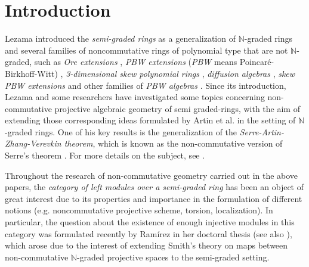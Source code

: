 \documentclass[reqno]{amsart}
\theoremstyle{definition}
\theoremstyle{remark}
\numberwithin{equation}{section}
\begin{document}
\maketitle


\section{Introduction}

Lezama \cite{LezamaLatorre2017} introduced the {\em semi-graded rings} as a generalization of $\mathbb{N}$-graded rings and several families of noncommutative rings of polynomial type that are not $\mathbb{N}$-graded, such as {\em Ore extensions} \cite{Fajardoetal2024, Ore1933}, {\em PBW extensions} ({\em PBW} means Poincar\'e-Birkhoff-Witt) \cite{BellGoodearl1988}, {\em 3-dimensional skew polynomial rings} \cite{BellSmith1990, Rosenberg1995}, {\em diffusion algebras} \cite{IsaevPyatovRittenberg2001, PyatovTwarock2002}, {\em skew PBW extensions} \cite{Fajardoetal2020, GallegoLezama2010, LezamaReyes2014} and other families of {\em PBW algebras} \cite{BuesoTorrecillasVerschoren2003, ReyesRodriguez2021, SeilerBook2010}. Since its introduction, Lezama and some researchers have investigated some topics concerning non-commutative projective algebraic geometry of semi graded-rings, with the aim of extending those corresponding ideas formulated by Artin et al. \cite{Artin1992, ArtinSchelter1987, ArtinTateVandenBergh2007, ArtinTateVandenBergh1991, ArtinZhang1994} in the setting of $\mathbb{N}$-graded rings. One of his key results is the generalization of the {\em Serre-Artin-Zhang-Verevkin theorem}, which is known as the non-commutative version of Serre's theorem \cite{Serre1995}. For more details on the subject, see \cite{ArtinZhang1994, ChaconPhDThesis2022, ChaconReyes2025, Lezama2021, Verevkin1992a, Verevkin1992}.

Throughout the research of non-commutative geometry carried out in the above papers, the {\em category of left modules over a semi-graded ring} has been an object of great interest due to its properties and importance in the formulation of different notions (e.g. noncommutative projective scheme, torsion, localization). In particular, the question about the existence of enough injective modules in this category was formulated recently by Ram\'irez in her doctoral thesis \cite[Section 3.4]{RamirezPhDThesis2023} (see also \cite[Section 4]{ChaconRamirezReyes2025}), which arose due to the interest of extending Smith's theory on maps between non-commutative $\mathbb{N}$-graded projective spaces \cite{Smith2003, Smith2016} to the semi-graded setting. 
\end{document}
